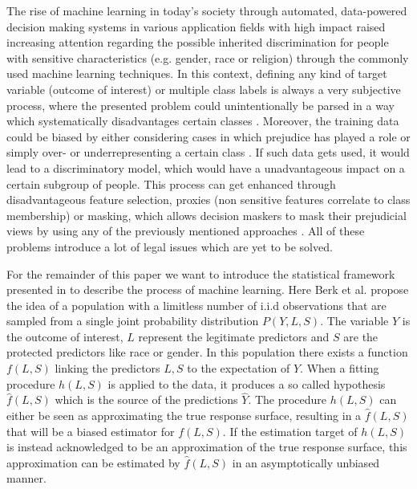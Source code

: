 The rise of machine learning in today's society through automated, data-powered decision making systems in various application fields with high impact raised increasing attention regarding the possible inherited discrimination for people with sensitive characteristics (e.g. gender, race or religion) through the commonly used machine learning techniques.
In this context, defining any kind of target variable (outcome of interest) or multiple class labels is always a very subjective process, where 
the presented problem could unintentionally be parsed in a way which systematically disadvantages 
certain classes \cite{Barocas.2016, barocas-hardt-narayanan}. Moreover, the training data could be biased by 
either considering cases in which prejudice has played a role or simply over- or underrepresenting 
a certain class \cite{Barocas.2016, barocas-hardt-narayanan}. If such data gets used, it would lead to a discriminatory model, which would have a unadvantageous impact on a certain subgroup of people. This process can get enhanced through disadvantageous feature selection, proxies (non sensitive features correlate to class membership) or masking, which allows decision maskers to mask their prejudicial views by using any of the previously mentioned approaches \cite{Barocas.2016, barocas-hardt-narayanan}. All of these problems introduce a lot of legal issues which are yet to be solved. 

For the remainder of this paper we want to introduce the statistical framework presented in \cite{Berk.2018} to describe the process of machine learning. Here Berk et al. propose the idea of a population with a limitless number of i.i.d observations that are sampled from a single joint probability distribution $P(Y,L,S)$. 
The variable $Y$ is the outcome of interest, $L$ represent the legitimate predictors and $S$ are the 
protected predictors like race or gender. In this population there exists a function $f(L,S)$ 
linking the predictors $L,S$ to the expectation of $Y$. When a fitting procedure $h(L,S)$ 
is applied to the data, it produces a so called hypothesis $\hat{f}(L,S)$ which is the 
source of the predictions $\hat{Y}$. The procedure $h(L,S)$ can either be seen as 
approximating the true response surface, resulting in a $\hat{f}(L,S)$ that will be a biased 
estimator for $f(L,S)$. If the estimation target of $h(L,S)$ is instead acknowledged to be 
an approximation of the true response surface, this approximation can be estimated by 
$\hat{f}(L,S)$ in an asymptotically unbiased manner.